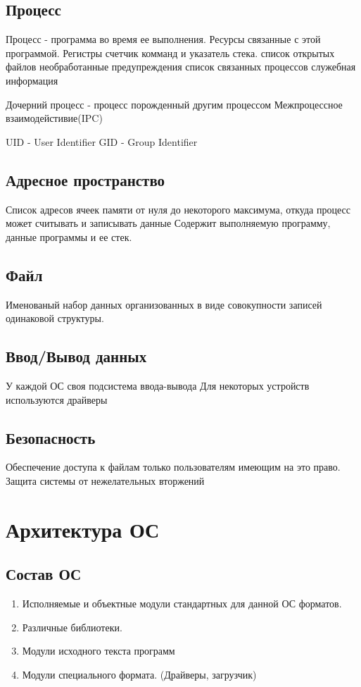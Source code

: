 \documentclass[a4paper]{article}
\begin{document}
\subsection{Процесс}
Процесс - программа во время ее выполнения. 
    Ресурсы связанные с этой программой. Регистры счетчик комманд и указатель стека.
    список открытых файлов
    необработанные предупреждения
    список связанных процессов
    служебная информация

Дочерний процесс - процесс порожденный другим процессом
Межпроцессное взаимодейстивие(IPC)

UID - User Identifier
GID - Group Identifier

\subsection{Адресное пространство}
Список адресов ячеек памяти от нуля до некоторого максимума, откуда процесс может считывать и записывать данные 
Содержит выполняемую программу, данные программы и ее стек.

\subsection{Файл}
Именованый набор данных организованных в виде совокупности записей одинаковой структуры.


\subsection{Ввод/Вывод данных}
У каждой ОС своя подсистема ввода-вывода
Для некоторых устройств используются драйверы

\subsection{Безопасность}
Обеспечение доступа к файлам только пользователям имеющим на это право. Защита системы от нежелательных вторжений

\section{Архитектура ОС}

\subsection{Состав ОС}

\begin{enumerate}
\item Исполняемые и объектные модули стандартных для данной ОС форматов.
\item Различные библиотеки.
\item Модули исходного текста программ
\item Модули специального формата. (Драйверы, загрузчик)
\end{enumerate}
\end{document}
